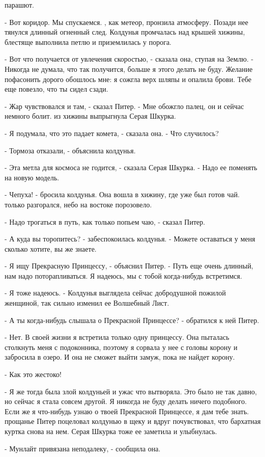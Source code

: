 парашют.
\par- Вот коридор. Мы спускаемся.
, как метеор, пронзила атмосферу. Позади нее тянулся длинный 
огненный след. Колдунья промчалась над крышей хижины, блестяще 
выполнила петлю и приземлилась у порога.
\par- Вот что получается от увлечения скоростью, - сказала она, ступая 
на Землю. - Никогда не думала, что так получится, больше я этого 
делать не буду. Желание пофасонить дорого обошлось мне: я сожгла верх 
шляпы и опалила брови. Тебе еще повезло, что ты сидел сзади.
\par- Жар чувствовался и там, - сказал Питер. - Мне обожгло палец, он 
и сейчас немного болит.
 из хижины выпрыгнула Серая Шкурка.
\par- Я подумала, что это падает комета, - сказала она. - Что 
случилось?
\par- Тормоза отказали, - объяснила колдунья.
\par- Эта метла для космоса не годится, - сказала Серая Шкурка. - Надо 
ее поменять на новую модель.
\par- Чепуха! - бросила колдунья. Она вошла в хижину, где уже был 
готов чай.
 только разгорался, небо на востоке порозовело.
\par- Надо трогаться в путь, как только попьем чаю, - сказал Питер.
\par- А куда вы торопитесь? - забеспокоилась колдунья. - Можете 
оставаться у меня сколько хотите, вы же знаете.
\par- Я ищу Прекрасную Принцессу, - объяснил Питер. - Путь еще очень 
длинный, нам надо поторапливаться. Я надеюсь, мы с тобой когда-нибудь 
встретимся.
\par- Я тоже надеюсь. - Колдунья выглядела сейчас добродушной пожилой 
женщиной, так сильно изменил ее Волшебный Лист.
\par- А ты когда-нибудь слышала о Прекрасной Принцессе? - обратился к 
ней Питер.
\par- Нет. В своей жизни я встретила только одну принцессу. Она 
пыталась столкнуть меня с подоконника, поэтому я сорвала у нее с 
головы корону и забросила в озеро. И она не сможет выйти замуж, пока 
не найдет корону.
\par- Как это жестоко!
\par- Я же тогда была злой колдуньей и ужас что вытворяла. Это было не 
так давно, но сейчас я стала совсем другой. Я никогда не буду делать 
ничего подобного. Если же я что-нибудь узнаю о твоей Прекрасной 
Принцессе, я дам тебе знать.
 прощанье Питер поцеловал колдунью в щеку и вдруг почувствовал, 
что бархатная куртка снова на нем. Серая Шкурка тоже ее заметила и 
улыбнулась.
\par- Мунлайт привязана неподалеку, - сообщила она.
